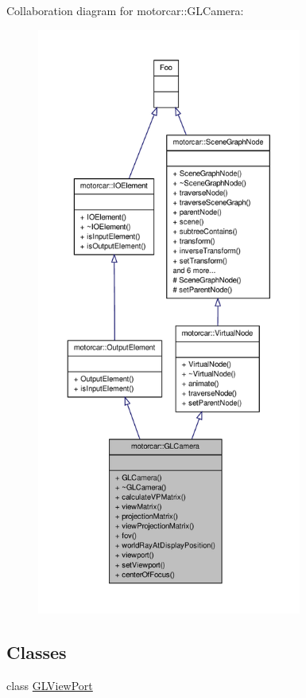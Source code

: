 Collaboration diagram for motorcar\-:\-:G\-L\-Camera\-:
\nopagebreak
\begin{figure}[H]
\begin{center}
\leavevmode
\includegraphics[height=550pt]{classmotorcar_1_1GLCamera__coll__graph}
\end{center}
\end{figure}
\subsection*{Classes}
\begin{DoxyCompactItemize}
\item 
class \hyperlink{classmotorcar_1_1GLCamera_1_1GLViewPort}{G\-L\-View\-Port}
\end{DoxyCompactItemize}
